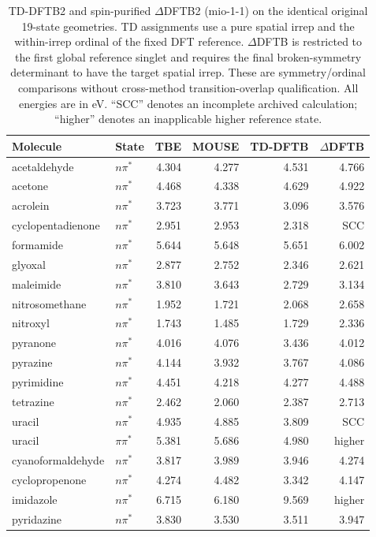 \begin{longtable}{llrrrr}
\caption{TD-DFTB2 and spin-purified $\Delta$DFTB2 (mio-1-1) on the identical original 19-state geometries. TD assignments use a pure spatial irrep and the within-irrep ordinal of the fixed DFT reference. $\Delta$DFTB is restricted to the first global reference singlet and requires the final broken-symmetry determinant to have the target spatial irrep. These are symmetry/ordinal comparisons without cross-method transition-overlap qualification. All energies are in eV. ``SCC'' denotes an incomplete archived calculation; ``higher'' denotes an inapplicable higher reference state.}\label{tab:dftbsymmetry}\\
\toprule
Molecule & State & TBE & MOUSE & TD-DFTB & $\Delta$DFTB \\
\midrule\endhead
acetaldehyde & $n\pi^*$ & 4.304 & 4.277 & 4.531 & 4.766 \\
acetone & $n\pi^*$ & 4.468 & 4.338 & 4.629 & 4.922 \\
acrolein & $n\pi^*$ & 3.723 & 3.771 & 3.096 & 3.576 \\
cyclopentadienone & $n\pi^*$ & 2.951 & 2.953 & 2.318 & SCC \\
formamide & $n\pi^*$ & 5.644 & 5.648 & 5.651 & 6.002 \\
glyoxal & $n\pi^*$ & 2.877 & 2.752 & 2.346 & 2.621 \\
maleimide & $n\pi^*$ & 3.810 & 3.643 & 2.729 & 3.134 \\
nitrosomethane & $n\pi^*$ & 1.952 & 1.721 & 2.068 & 2.658 \\
nitroxyl & $n\pi^*$ & 1.743 & 1.485 & 1.729 & 2.336 \\
pyranone & $n\pi^*$ & 4.016 & 4.076 & 3.436 & 4.012 \\
pyrazine & $n\pi^*$ & 4.144 & 3.932 & 3.767 & 4.086 \\
pyrimidine & $n\pi^*$ & 4.451 & 4.218 & 4.277 & 4.488 \\
tetrazine & $n\pi^*$ & 2.462 & 2.060 & 2.387 & 2.713 \\
uracil & $n\pi^*$ & 4.935 & 4.885 & 3.809 & SCC \\
uracil & $\pi\pi^*$ & 5.381 & 5.686 & 4.980 & higher \\
cyanoformaldehyde & $n\pi^*$ & 3.817 & 3.989 & 3.946 & 4.274 \\
cyclopropenone & $n\pi^*$ & 4.274 & 4.482 & 3.342 & 4.147 \\
imidazole & $n\pi^*$ & 6.715 & 6.180 & 9.569 & higher \\
pyridazine & $n\pi^*$ & 3.830 & 3.530 & 3.511 & 3.947 \\
\bottomrule
\end{longtable}
